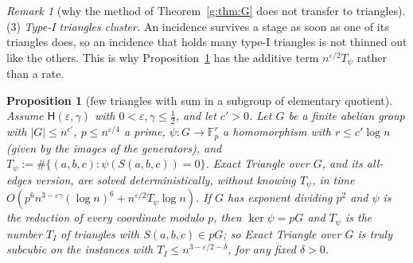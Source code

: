 \documentclass[11pt]{article}
\newtheorem{proposition}[theorem]{Proposition}
\theoremstyle{definition}
\theoremstyle{remark}
\newtheorem{remark}[theorem]{Remark}
\newcommand{\Fp}{\mathbb{F}_p}
\newcommand{\eps}{\varepsilon}
\newcommand{\Hyp}{\mathsf{H}}
\begin{document}
\begin{remark}[why the method of Theorem~\ref{g:thm:G} does not transfer to triangles]
(3) \emph{Type-I triangles cluster.} An incidence survives a stage as soon as one of its triangles does, so an incidence that holds many type-I triangles is not thinned out like the others. This is why Proposition~\ref{g:prop:trilight} has the additive term $n^{\eps/2}T_\psi$ rather than a rate.
\end{remark}

\begin{proposition}[few triangles with sum in a subgroup of elementary quotient]\label{g:prop:trilight}
Assume $\Hyp(\eps,\gamma)$ with $0<\eps,\gamma\le\frac12$, and let $c'>0$. Let $G$ be a finite abelian group with $|G|\le n^{c'}$, $p\le n^{\eps/4}$ a prime, $\psi\colon G\to\Fp^r$ a homomorphism with $r\le c'\log n$ (given by the images of the generators), and $T_\psi:=\#\{(a,b,c):\psi(S(a,b,c))=0\}$. Exact Triangle over $G$, and its all-edges version, are solved deterministically, without knowing $T_\psi$, in time $O(p^6n^{3-\eps\gamma}(\log n)^6+n^{\eps/2}T_\psi\log n)$. If $G$ has exponent dividing $p^2$ and $\psi$ is the reduction of every coordinate modulo $p$, then $\ker\psi=pG$ and $T_\psi$ is the number $T_I$ of triangles with $S(a,b,c)\in pG$; so Exact Triangle over $G$ is truly subcubic on the instances with $T_I\le n^{3-\eps/2-\delta}$, for any fixed $\delta>0$.
\end{proposition}
\end{document}
